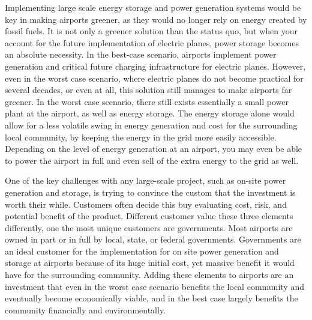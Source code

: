




Implementing large scale energy storage and power generation systems would be key in making airports greener, as they would no longer rely on energy created by fossil fuels. It is not only a greener solution than the status quo, but when your account for the future implementation of electric planes, power storage becomes an absolute necessity. In the best-case scenario, airports implement power generation and critical future charging infrastructure for electric planes. However, even in the worst case scenario, where electric planes do not become practical for several decades, or even at all, this solution still manages to make airports far greener. In the worst case scenario, there still exists essentially a small power plant at the airport, as well as energy storage. The energy storage alone would allow for a less volatile swing in energy generation and cost for the surrounding local community, by keeping the energy in the grid more easily accessible. Depending on the level of energy generation at an airport, you may even be able to power the airport in full and even sell of the extra energy to the grid as well. \par
One of the key challenges with any large-scale project, such as on-site power generation and storage, is trying to convince the custom that the investment is worth their while. Customers often decide this buy evaluating cost, risk, and potential benefit of the product. Different customer value these three elements differently, one the most unique customers are governments. Most airports are owned in part or in full by local, state, or federal governments. Governments are an ideal customer for the implementation for on site power generation and storage at airports because of its huge initial cost, yet massive benefit it would have for the surrounding community. Adding these elements to airports are an investment that even in the worst case scenario benefits the local community and eventually become economically viable, and in the best case largely benefits the community financially and environmentally.  \par
